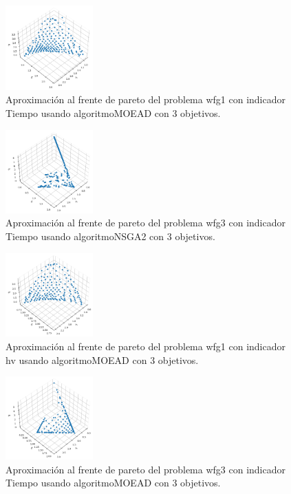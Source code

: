\documentclass{article}
\begin{document}
\begin{figure}
	\includegraphics[width=0.3\textwidth]{MOEAD_wfg1_Tiempo_3_fp.png}
	\caption{Aproximación al frente de pareto del problema wfg1 con indicador Tiempo usando algoritmoMOEAD con 3 objetivos.}
\end{figure}
\begin{figure}
	\includegraphics[width=0.3\textwidth]{NSGA2_wfg3_Tiempo_3_fp.png}
	\caption{Aproximación al frente de pareto del problema wfg3 con indicador Tiempo usando algoritmoNSGA2 con 3 objetivos.}
\end{figure}
\clearpage
\begin{figure}
	\includegraphics[width=0.3\textwidth]{MOEAD_wfg1_hv_3_fp.png}
	\caption{Aproximación al frente de pareto del problema wfg1 con indicador hv usando algoritmoMOEAD con 3 objetivos.}
\end{figure}
\begin{figure}
	\includegraphics[width=0.3\textwidth]{MOEAD_wfg3_Tiempo_3_fp.png}
	\caption{Aproximación al frente de pareto del problema wfg3 con indicador Tiempo usando algoritmoMOEAD con 3 objetivos.}
\end{figure}
\end{document}
